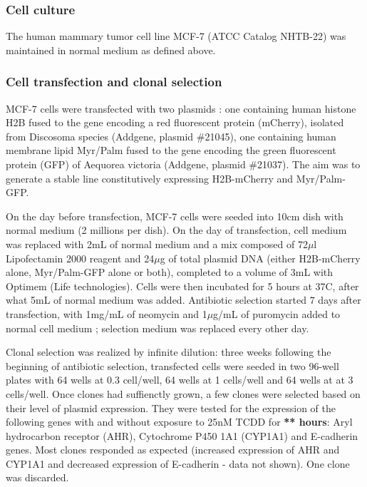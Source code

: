 \subsubsection{Cell culture}
The human mammary tumor cell line MCF-7 (ATCC\up{\textregistered} Catalog NHTB-22\texttrademark)  was maintained in normal medium as defined above. %
\subsubsection{Cell transfection and clonal selection}
MCF-7 cells were transfected with two plasmids : one containing human histone H2B fused to the gene encoding a red fluorescent protein (mCherry), isolated from Discosoma species (Addgene, plasmid \#21045), one containing human membrane lipid Myr/Palm fused to the gene encoding the green fluorescent protein (GFP) of Aequorea victoria (Addgene, plasmid \#21037). The aim was to generate a stable line constitutively expressing H2B-mCherry and Myr/Palm-GFP.

On the day before transfection, MCF-7 cells were seeded into 10cm dish with normal medium (2 millions per dish). On the day of transfection, cell medium was replaced with 2mL of normal medium and a mix composed of 72$\mu$l Lipofectamin\up{\textregistered} 2000 reagent and 24$\mu$g of total plasmid DNA (either H2B-mCherry alone, Myr/Palm-GFP alone or both), completed to a volume of 3mL with Optimem (Life technologies\texttrademark). Cells were then incubated for 5 hours at 37C, after what 5mL of normal medium was added. 
Antibiotic selection started 7 days after transfection, with 1mg/mL of neomycin and 1$\mu$g/mL of puromycin added to normal cell medium ; selection medium was replaced every other day.

Clonal selection was realized by infinite dilution: three weeks following the beginning of antibiotic selection, transfected cells were seeded in two 96-well plates with 64 wells at 0.3 cell/well, 64 wells at 1 cells/well and 64 wells at at 3 cells/well. Once clones had suffienctly grown, a few clones were selected based on their level of plasmid expression. They were tested for the expression of the following genes with and without exposure to 25nM TCDD for \textbf{** hours}: Aryl hydrocarbon receptor  (AHR), Cytochrome P450 1A1 (CYP1A1) and E-cadherin genes. Most clones responded as expected (increased expression of AHR and CYP1A1 and decreased expression of E-cadherin - data not shown). One clone was discarded.

